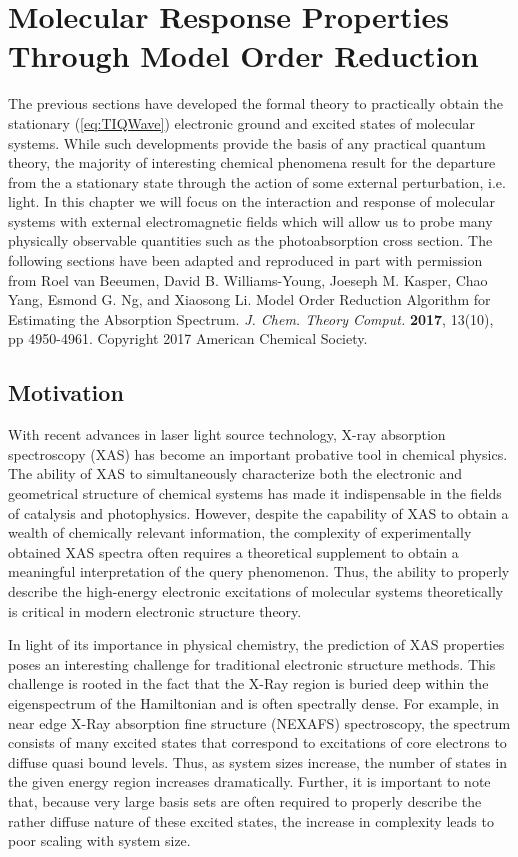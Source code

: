 \chapter{Molecular Response Properties Through Model Order Reduction}
\label{ch:MOR}


The previous sections have developed the formal theory to practically obtain the stationary 
(\cref{eq:TIQWave}) electronic ground and excited states of molecular systems.
While such developments provide the basis of any practical quantum theory, the majority of interesting chemical
phenomena result for the departure from the a stationary state through the action of some external perturbation,
i.e. light. In this chapter we will focus on the interaction and response of molecular systems with external 
electromagnetic fields which will allow us to probe many physically observable quantities such as
the photoabsorption cross section. The following sections have been adapted and reproduced in part with
permission from Roel van Beeumen, David B. Williams-Young, Joeseph M. Kasper, Chao Yang, Esmond G. Ng,
and Xiaosong Li. Model Order Reduction Algorithm for Estimating the Absorption Spectrum. 
\emph{J. Chem. Theory Comput.} \textbf{2017}, 13(10), pp 4950-4961. Copyright 2017 American Chemical
Society.


\section{Motivation}

With recent advances in  laser light source technology, X-ray
absorption spectroscopy (XAS) has become an important probative tool in
chemical physics.\cite{Stohr13_book} The ability of XAS to simultaneously
characterize both the electronic and geometrical structure of chemical systems
has made it indispensable in the fields of catalysis and
photophysics.\cite{Koch87_519,Chasse12_4870,Solomon95_2259,Hodgson00_5775,Hessler01_262}
However, despite the capability of XAS to obtain a wealth of chemically
relevant information, the complexity of experimentally obtained XAS spectra
often requires a theoretical supplement to obtain a meaningful interpretation
of the query phenomenon.\cite{Li16_639,Li16_JA2} Thus, the ability to properly
describe the high-energy electronic excitations of molecular systems
theoretically is critical in modern electronic structure theory.

In light of its importance in physical chemistry, the prediction of XAS properties poses an interesting challenge for traditional electronic structure methods. 
This challenge is rooted in the fact that the X-Ray region is buried deep within the eigenspectrum of the Hamiltonian and is often spectrally dense. 
For example, in near edge X-Ray absorption fine structure (NEXAFS) spectroscopy, the spectrum consists of many excited states that correspond to excitations of core electrons to diffuse quasi bound levels. 
Thus, as system sizes increase, the number of states in the given energy region increases dramatically. 
Further, it is important to note that, because very large basis sets are often required to properly describe the rather diffuse nature of these excited states, the increase in complexity leads to poor scaling with system size.

